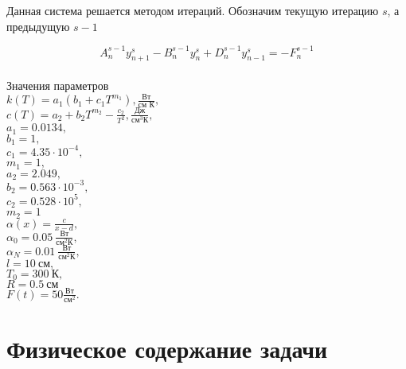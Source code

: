 \documentclass[a4paper, 14pt]{article}
\begin{document}
Данная система решается методом итераций. Обозначим текущую итерацию $s$, а предыдущую $s - 1$ 

$${A}_n^{s-1}{y}_{n+1}^{s}-{B}_n^{s-1}{y}_n^{s}+{D}^{s-1}_n{y}_{n-1}^{s}=-{F}^{s-1}_n$$\\

Значения параметров\\

$k(T) = a_1(b_1 + c_1 T^{m_1}), \frac{\text{Вт}}{\text{см К}},$\\
 $c(T) = a_2 + b_2 T^{m_2} - \frac{c_2}{T^2}, \frac{\text{Дж}}{\text{см}^3 \text{К}},$ \\
$a_1 = 0.0134,$\\
$b_1 = 1,$\\
$ c_1 = 4.35 \cdot 10^{-4},$\\
$ m_1=1,$ \\
$a_2 = 2.049,$\\
$ b_2 = 0.563 \cdot 10^{-3},$\\
$c_2 = 0.528 \cdot 10^5,$\\
$ m_2 = 1 $\\
$\alpha(x) = \frac{c}{x-d}, $\\
$\alpha_0 = 0.05\ \frac{\text{Вт}}{\text{см}^2 \text{К}}, $\\
$\alpha_N = 0.01\ \frac{\text{Вт}}{\text{см}^2 \text{К}}, $\\
$l = 10\ \text{см}, $\\
$T_0 = 300\ \text{К},$ \\
$R = 0.5\ \text{см} $\\
$ F(t) = 50 \frac{\text{Вт}}{\text{см}^2}.$


\section*{Физическое содержание задачи}
\end{document}
